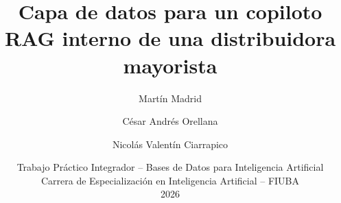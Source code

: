 \documentclass[11pt,a4paper]{article}
\title{Capa de datos para un copiloto RAG interno de una distribuidora mayorista}
\author{Martín Madrid \and César Andrés Orellana \and Nicolás Valentín Ciarrapico}
\date{Trabajo Práctico Integrador -- Bases de Datos para Inteligencia Artificial\\Carrera de Especialización en Inteligencia Artificial -- FIUBA\\2026}
\begin{document}
\maketitle
\begin{abstract}

\end{abstract}
\newpage
\tableofcontents
\newpage















\appendix

\end{document}
